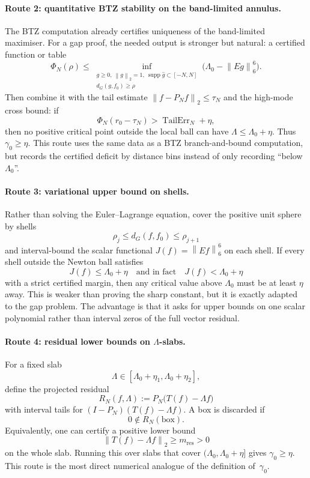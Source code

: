 \documentclass[12pt]{article}
\theoremstyle{definition}
\theoremstyle{remark}
\DeclareMathOperator{\supp}{supp}
\newcommand{\norm}[1]{\left\|#1\right\|}
\begin{document}
\paragraph{Route 2: quantitative BTZ stability on the band-limited
annulus.}
The BTZ computation already certifies uniqueness of the band-limited
maximiser.  For a gap proof, the needed output is stronger but natural:
a certified function or table
\[
  \Phi_N(\rho)
  \leq
  \inf_{\substack{
      g\geq0,\ \norm{g}_2=1,\ \supp\widehat g\subset[-N,N]\\
      d_G(g,f_0)\geq\rho}}
  \bigl(\Lambda_0-\norm{Eg}_6^6\bigr).
\]
Then combine it with the tail estimate
\(\norm{f-P_Nf}_2\leq\tau_N\) and the high-mode cross bound:
if
\begin{equation}\label{eq:gamma-btz-criterion}
  \Phi_N(r_0-\tau_N)
  >
  \operatorname{TailErr}_N+\eta,
\end{equation}
then no positive critical point outside the local ball can have
\(\Lambda\leq\Lambda_0+\eta\).  Thus
\(\gamma_0\geq\eta\).  This route uses the same data as a BTZ
branch-and-bound computation, but records the certified deficit by
distance bins instead of only recording ``below~$\Lambda_0$''.

\paragraph{Route 3: variational upper bound on shells.}
Rather than solving the Euler--Lagrange equation, cover the positive
unit sphere by shells
\[
  \rho_j\leq d_G(f,f_0)\leq \rho_{j+1}
\]
and interval-bound the scalar functional \(J(f)=\norm{Ef}_6^6\) on each
shell.  If every shell outside the Newton ball satisfies
\[
  J(f)\leq \Lambda_0+\eta
  \quad\text{and in fact}\quad
  J(f)<\Lambda_0+\eta
\]
with a strict certified margin, then any critical value above
\(\Lambda_0\) must be at least \(\eta\) away.  This is weaker than proving
the sharp constant, but it is exactly adapted to the gap problem.  The
advantage is that it asks for upper bounds on one scalar polynomial rather
than interval zeros of the full vector residual.

\paragraph{Route 4: residual lower bounds on $\Lambda$-slabs.}
For a fixed slab
\[
  \Lambda\in[\Lambda_0+\eta_1,\Lambda_0+\eta_2],
\]
define the projected residual
\[
  R_N(f,\Lambda)
  :=
  P_N\bigl(T(f)-\Lambda f\bigr)
\]
with interval tails for \((I-P_N)(T(f)-\Lambda f)\).  A box is discarded
if
\[
  0\notin R_N(\text{box}).
\]
Equivalently, one can certify a positive lower bound
\[
  \norm{T(f)-\Lambda f}_2\geq m_{\mathrm{res}}>0
\]
on the whole slab.  Running this over slabs that cover
\((\Lambda_0,\Lambda_0+\eta]\) gives $\gamma_0\geq\eta$.  This route is
the most direct numerical analogue of the definition of~$\gamma_0$.
\end{document}
